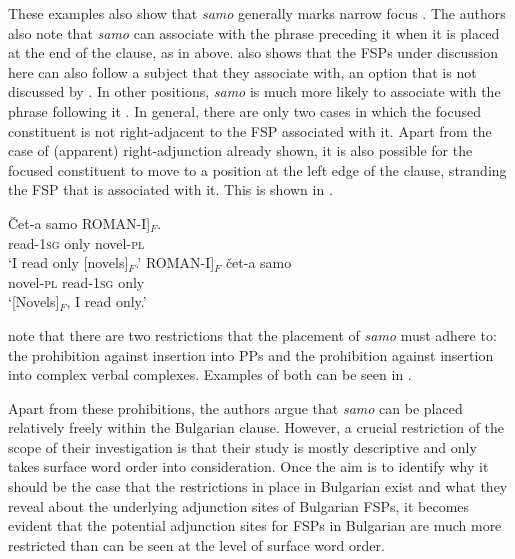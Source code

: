 \documentclass[output=paper,colorlinks,citecolor=brown]{langscibook}
\begin{document}
\noindent These examples also show that \textit{samo} generally marks narrow focus \citep{TishevaDzhonova2003}. The authors also note that \textit{samo} can associate with the phrase preceding it when it is placed at the end of the clause, as in  above.  also shows that the FSPs under discussion here can also follow a subject that they associate with, an option that is not discussed by \citet{TishevaDzhonova2003}. In other positions, \textit{samo} is much more likely to associate with the phrase following it \citep[6--7]{TishevaDzhonova2003}. In general, there are only two cases in which the focused constituent is not right-adjacent to the FSP associated with it. Apart from the case of (apparent) right-adjunction already shown, it is also possible for the focused constituent to move to a position at the left edge of the clause, stranding the FSP that is associated with it. This is shown in .  \par

\ea\label{movement1}
\ea
\gll \v{C}et-a samo \minsp{[} ROMAN-I]$_{F}$. \\
read-\textsc{1sg} only {} novel-\textsc{pl} \\
\glt `I read only [novels]$_{F}$.’
\ex
\gll \minsp{[} ROMAN-I]$_{F}$ \v{c}et-a samo \\
{} novel-\textsc{pl} read-\textsc{1sg} only \\
\glt `[Novels]$_{F}$, I read only.’
\z
\z 

\noindent \citet{TishevaDzhonova2003} note that there are two restrictions that the placement of \textit{samo} must adhere to: the prohibition against insertion into PPs and the prohibition against insertion into complex verbal complexes. Examples of both can be seen in . 

\ea\label{Bulgarian:basic4}
\z
\z

\noindent Apart from these prohibitions, the authors argue that \textit{samo} can be placed relatively freely within the Bulgarian clause. However, a crucial restriction of the scope of their investigation is that their study is mostly descriptive and only takes surface word order into consideration. Once the aim is to identify why it should be the case that the restrictions in place in Bulgarian exist and what they reveal about the underlying adjunction sites of Bulgarian FSPs, it becomes evident that the potential adjunction sites for FSPs in Bulgarian are much more restricted than can be seen at the level of surface word order. \par 
\end{document}
